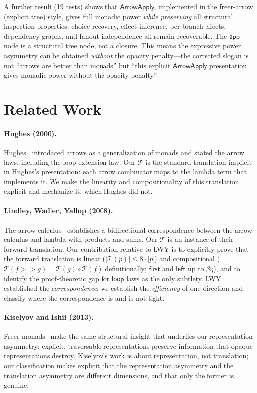 \documentclass[11pt,a4paper]{article}
\theoremstyle{definition}
\theoremstyle{remark}
\newcommand{\comp}{\mathbin{>\!\!>}}
\newcommand{\first}{\mathsf{first}}
\newcommand{\leftc}{\mathsf{left}}
\newcommand{\loopop}{\mathsf{loop}}
\newcommand{\app}{\mathsf{app}}
\newcommand{\ArrowApply}{\mathsf{ArrowApply}}
\newcommand{\T}{\mathcal{T}}
\newcommand{\size}[1]{\lvert #1 \rvert}
\begin{document}
A further result (19 tests) shows that $\ArrowApply$, implemented in the
freer-arrow (explicit tree) style, gives full monadic power \emph{while
preserving} all structural inspection properties: choice recovery, effect
inference, per-branch effects, dependency graphs, and fanout independence
all remain recoverable. The $\app$ node is a structural tree node, not a
closure. This means the expressive power asymmetry can be obtained
\emph{without} the opacity penalty---the corrected slogan is not ``arrows
are better than monads'' but ``this explicit $\ArrowApply$ presentation
gives monadic power without the opacity penalty.''

\section{Related Work}\label{sec:related}

\paragraph{Hughes (2000).}
Hughes~\cite{hughes2000} introduced arrows as a generalization of monads
and stated the arrow laws, including the loop extension law. Our $\T$ is
the standard translation implicit in Hughes's presentation: each arrow
combinator maps to the lambda term that implements it. We make the
linearity and compositionality of this translation explicit and mechanize
it, which Hughes did not.

\paragraph{Lindley, Wadler, Yallop (2008).}
The arrow calculus~\cite{lindley2008arrow} establishes a bidirectional
correspondence between the arrow calculus and lambda with products and
sums. Our $\T$ is an instance of their forward translation. Our
contribution relative to LWY is to explicitly prove that the forward
translation is linear ($\size{\T(p)} \leq 8\cdot\size{p}$) and
compositional ($\T(f \comp g) = \T(g) \circ \T(f)$ definitionally; $\first$
and $\leftc$ up to $\beta\eta$), and to identify the proof-theoretic gap
for $\loopop$ laws as the only subtlety. LWY established the
\emph{correspondence}; we establish the \emph{efficiency} of one direction
and classify where the correspondence is and is not tight.

\paragraph{Kiselyov and Ishii (2013).}
Freer monads~\cite{kiselyov2013freer} make the same structural insight that
underlies our representation asymmetry: explicit, traversable
representations preserve information that opaque representations destroy.
Kiselyov's work is about representation, not translation; our
classification makes explicit that the representation asymmetry and the
translation asymmetry are different dimensions, and that only the former is
genuine.
\end{document}
